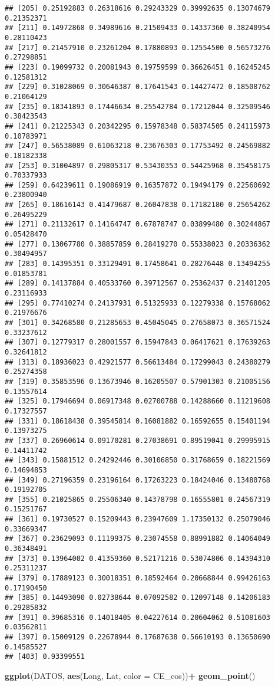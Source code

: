 \documentclass[
]{article}
\newenvironment{Shaded}{\begin{snugshade}}{\end{snugshade}}
\newcommand{\DataTypeTok}[1]{\textcolor[rgb]{0.13,0.29,0.53}{#1}}
\newcommand{\KeywordTok}[1]{\textcolor[rgb]{0.13,0.29,0.53}{\textbf{#1}}}
\newcommand{\NormalTok}[1]{#1}
\newcommand{\OperatorTok}[1]{\textcolor[rgb]{0.81,0.36,0.00}{\textbf{#1}}}
\newcommand{\StringTok}[1]{\textcolor[rgb]{0.31,0.60,0.02}{#1}}
\begin{document}
\begin{verbatim}
## [205] 0.25192883 0.26318616 0.29243329 0.39992635 0.13074679 0.21352371
## [211] 0.14972868 0.34989616 0.21509433 0.14337360 0.38240954 0.28110423
## [217] 0.21457910 0.23261204 0.17880893 0.12554500 0.56573276 0.27298851
## [223] 0.19099732 0.20081943 0.19759599 0.36626451 0.16245245 0.12581312
## [229] 0.31028069 0.30646387 0.17641543 0.14427472 0.18508762 0.21064129
## [235] 0.18341893 0.17446634 0.25542784 0.17212044 0.32509546 0.38423543
## [241] 0.21225343 0.20342295 0.15978348 0.58374505 0.24115973 0.10783971
## [247] 0.56538089 0.61063218 0.23676303 0.17753492 0.24569882 0.18182338
## [253] 0.31004897 0.29805317 0.53430353 0.54425968 0.35458175 0.70337933
## [259] 0.64239611 0.19086919 0.16357872 0.19494179 0.22560692 0.23800940
## [265] 0.18616143 0.41479687 0.26047838 0.17182180 0.25654262 0.26495229
## [271] 0.21132617 0.14164747 0.67878747 0.03899480 0.30244867 0.05428470
## [277] 0.13067780 0.38857859 0.28419270 0.55338023 0.20336362 0.30494957
## [283] 0.14395351 0.33129491 0.17458641 0.28276448 0.13494255 0.01853781
## [289] 0.14137884 0.40533760 0.39712567 0.25362437 0.21401205 0.23116933
## [295] 0.77410274 0.24137931 0.51325933 0.12279338 0.15768062 0.21976676
## [301] 0.34268580 0.21285653 0.45045045 0.27658073 0.36571524 0.33237612
## [307] 0.12779317 0.28001557 0.15947843 0.06417621 0.17639263 0.32641812
## [313] 0.18936023 0.42921577 0.56613484 0.17299043 0.24380279 0.25274358
## [319] 0.35853596 0.13673946 0.16205507 0.57901303 0.21005156 0.13557614
## [325] 0.17946694 0.06917348 0.02700788 0.14288660 0.11219608 0.17327557
## [331] 0.18618438 0.39545814 0.16081882 0.16592655 0.15401194 0.13973275
## [337] 0.26960614 0.09170281 0.27038691 0.89519041 0.29995915 0.14411742
## [343] 0.15881512 0.24292446 0.30106850 0.31768659 0.18221569 0.14694853
## [349] 0.27196359 0.23196164 0.17263223 0.18424046 0.13480768 0.19192705
## [355] 0.21025865 0.25506340 0.14378798 0.16555801 0.24567319 0.15251767
## [361] 0.19730527 0.15209443 0.23947609 1.17350132 0.25079046 0.33669347
## [367] 0.23629093 0.11199375 0.23074558 0.88991882 0.14064049 0.36348491
## [373] 0.13964002 0.41359360 0.52171216 0.53074806 0.14394310 0.25311237
## [379] 0.17889123 0.30018351 0.18592464 0.20668844 0.99426163 0.17190450
## [385] 0.14493090 0.02738644 0.07092582 0.12097148 0.14206183 0.29285832
## [391] 0.39685316 0.14018405 0.04227614 0.20604062 0.51081603 0.03562811
## [397] 0.15009129 0.22678944 0.17687638 0.56610193 0.13650690 0.14585527
## [403] 0.93399551
\end{verbatim}

\begin{Shaded}
\begin{Highlighting}[]
\KeywordTok{ggplot}\NormalTok{(DATOS, }\KeywordTok{aes}\NormalTok{(Long, Lat, }\DataTypeTok{color =}\NormalTok{ CE_cos))}\OperatorTok{+}
\StringTok{  }\KeywordTok{geom_point}\NormalTok{()}
\end{Highlighting}
\end{Shaded}
\end{document}

